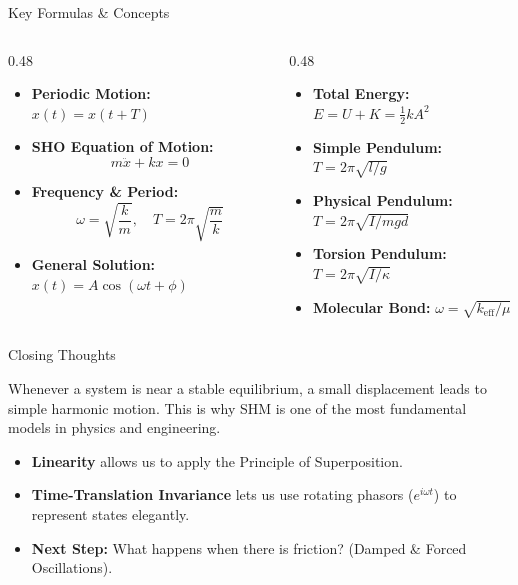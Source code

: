 \documentclass[aspectratio=169,xcolor=dvipsnames]{beamer}
\begin{document}
\begin{frame}{Key Formulas \& Concepts}
  \begin{columns}[T]
    \begin{column}{0.48\textwidth}
      \begin{itemize}
        \item \textbf{Periodic Motion:} $x(t) = x(t+T)$
        \item \textbf{SHO Equation of Motion:}
              \[
                m\ddot{x} + kx = 0
              \]
        \item \textbf{Frequency \& Period:}
              \[
                \omega = \sqrt{\frac{k}{m}}, \quad T = 2\pi\sqrt{\frac{m}{k}}
              \]
        \item \textbf{General Solution:} $x(t) = A\cos(\omega t + \phi)$
      \end{itemize}
    \end{column}
    \begin{column}{0.48\textwidth}
      \begin{itemize}
        \item \textbf{Total Energy:} $E = U + K = \frac{1}{2}kA^2$
        \item \textbf{Simple Pendulum:} $T = 2\pi\sqrt{l/g}$
        \item \textbf{Physical Pendulum:} $T = 2\pi\sqrt{I/mgd}$
        \item \textbf{Torsion Pendulum:} $T = 2\pi\sqrt{I/\kappa}$
        \item \textbf{Molecular Bond:} $\omega = \sqrt{k_{\text{eff}}/\mu}$
      \end{itemize}
    \end{column}
  \end{columns}
\end{frame}

\begin{frame}{Closing Thoughts}
  \begin{umnote}
    Whenever a system is near a stable equilibrium, a small displacement leads to simple harmonic motion. This is why SHM is one of the most fundamental models in physics and engineering.
  \end{umnote}
  \vspace{1.0em}
  \begin{itemize}
    \item \textbf{Linearity} allows us to apply the Principle of Superposition.
    \item \textbf{Time-Translation Invariance} lets us use rotating phasors ($e^{i\omega t}$) to represent states elegantly.
    \item \textbf{Next Step:} What happens when there is friction? (Damped \& Forced Oscillations).
  \end{itemize}
\end{frame}
\end{document}
